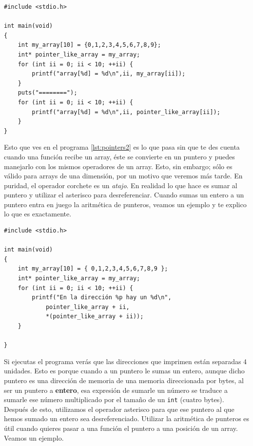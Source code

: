 \documentclass[a4paper]{article}
\begin{document}
\noindent
\begin{minipage}[H]{\linewidth}
\mbox{}
\begin{lstlisting}[style=C, label={lst:pointers2},
caption={Arrays como punteros}]
#include <stdio.h>

int main(void)
{
    int my_array[10] = {0,1,2,3,4,5,6,7,8,9};
    int* pointer_like_array = my_array;
    for (int ii = 0; ii < 10; ++ii) {
        printf("array[%d] = %d\n",ii, my_array[ii]);
    }
    puts("========");
    for (int ii = 0; ii < 10; ++ii) {
        printf("array[%d] = %d\n",ii, pointer_like_array[ii]);
    }
}
\end{lstlisting}
\end{minipage}


Esto que ves en el programa \ref{lst:pointers2} es lo que pasa
sin que te des cuenta cuando una
función recibe un array, éste se convierte en un puntero y puedes manejarlo
con los mismos operadores de un array. Esto, sin embargo; sólo es válido para
arrays de una dimensión, por un motivo que veremos más tarde.
En puridad, el operador corchete es un \textit{atajo}. En realidad lo que hace
es sumar al puntero y utilizar el asterisco para desreferenciar. Cuando sumas
un entero a un puntero entra en juego la aritmética de punteros, veamos
un ejemplo y te explico lo que es exactamente.


\noindent
\begin{minipage}[H]{\linewidth}
\mbox{}
\begin{lstlisting}[style=C, label={lst:pointers3},
caption={Aritmética de punteros}]
#include <stdio.h>

int main(void)
{
    int my_array[10] = { 0,1,2,3,4,5,6,7,8,9 };
    int* pointer_like_array = my_array;
    for (int ii = 0; ii < 10; ++ii) {
        printf("En la dirección %p hay un %d\n",
            pointer_like_array + ii,
            *(pointer_like_array + ii));
    }

}
\end{lstlisting}
\end{minipage}


Si ejecutas el programa verás que las direcciones que imprimen están separadas
4 unidades. Esto es porque cuando a un puntero le sumas un entero, aunque dicho
puntero es una dirección de memoria de una memoria direccionada por bytes, al
ser un puntero a \textbf{entero}, esa expresión de sumarle un número se traduce
a sumarle ese número multiplicado por el tamaño de un \verb!int! (cuatro bytes).
Después de esto, utilizamos el
operador asterisco para que ese puntero al que hemos sumado un entero sea
desreferenciado. Utilizar la aritmética de punteros es útil cuando quieres
pasar a una función el puntero a una posición de un array. Veamos un ejemplo.
\end{document}
